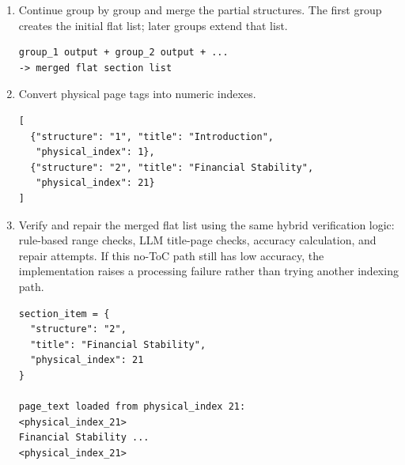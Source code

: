 \documentclass[11pt,a4paper]{article}
\begin{document}
\begin{enumerate}
\begin{itemize}
\begin{enumerate}[label=(\alph*)]
\begin{lstlisting}[style=pageTextBlockInList]
<physical_index_21>
Financial Stability ...
<physical_index_21>
\end{lstlisting}
\textbf{LLM Output}: A flat section list detected from that group.
\begin{lstlisting}[style=pageTextBlockInList]
[
  {"structure": "1", "title": "Introduction",
   "physical_index": "<physical_index_1>"},
  {"structure": "2", "title": "Financial Stability",
   "physical_index": "<physical_index_21>"}
]
\end{lstlisting}
            \item Continue group by group and merge the partial structures. The first group creates the initial flat list; later groups extend that list.
\begin{lstlisting}[style=pageTextBlockInList]
group_1 output + group_2 output + ... 
-> merged flat section list
\end{lstlisting}
            \item Convert physical page tags into numeric indexes.
\begin{lstlisting}[style=pageTextBlockInList]
[
  {"structure": "1", "title": "Introduction",
   "physical_index": 1},
  {"structure": "2", "title": "Financial Stability",
   "physical_index": 21}
]
\end{lstlisting}
            \item Verify and repair the merged flat list using the same hybrid verification logic: rule-based range checks, LLM title-page checks, accuracy calculation, and repair attempts. If this no-ToC path still has low accuracy, the implementation raises a processing failure rather than trying another indexing path.
\begin{lstlisting}[style=pageTextBlockInList]
section_item = {
  "structure": "2",
  "title": "Financial Stability",
  "physical_index": 21
}

page_text loaded from physical_index 21:
<physical_index_21>
Financial Stability ...
<physical_index_21>


\end{lstlisting}
\end{enumerate}
\end{itemize}
\end{enumerate}
\end{document}
